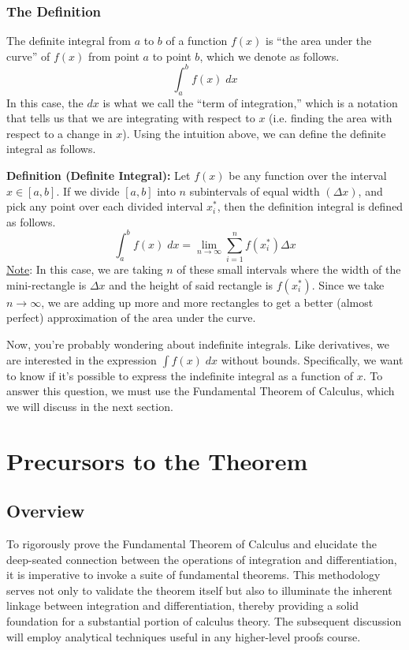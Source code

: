 \subsubsection{The Definition}
The definite integral from $a$ to $b$ of a function $f(x)$ is ``the area under the curve'' of $f(x)$ from point $a$ to point $b$, which we denote as follows.
$$
\int_a^b f(x) \;dx
$$
In this case, the $dx$ is what we call the ``term of integration,'' which is a notation that tells us that we are integrating with respect to $x$ (i.e. finding the area with respect to a change in $x$). Using the intuition above, we can define the definite integral as follows.
\begin{boxedsection}
  \textbf{Definition (Definite Integral):} Let $f(x)$ be any function over the interval $x \in [a,b]$. If we divide $[a,b]$ into $n$ subintervals of equal width $(\Delta x)$, and pick any point over each divided interval $x_i^*$, then the definition integral is defined as follows.
  $$
  \int_a^b f(x) \;dx = \lim_{n\rightarrow\infty} \sum_{i=1}^n f(x_i^*) \Delta x 
  $$
  \underline{Note}: In this case, we are taking $n$ of these small intervals where the width of the mini-rectangle is $\Delta x$ and the height of said rectangle is $f(x_i^*)$. Since we take $n \rightarrow \infty$, we are adding up more and more rectangles to get a better (almost perfect) approximation of the area under the curve.
\end{boxedsection}
Now, you're probably wondering about indefinite integrals. Like derivatives, we are interested in the expression $\int f(x)\;dx$ without bounds. Specifically, we want to know if it's possible to express the indefinite integral as a function of $x$. To answer this question, we must use the Fundamental Theorem of Calculus, which we will discuss in the next section.
\pagebreak
\section{Precursors to the Theorem}
\subsection{Overview}
To rigorously prove the Fundamental Theorem of Calculus and elucidate the deep-seated connection between the operations of integration and differentiation, it is imperative to invoke a suite of fundamental theorems. This methodology serves not only to validate the theorem itself but also to illuminate the inherent linkage between integration and differentiation, thereby providing a solid foundation for a substantial portion of calculus theory. The subsequent discussion will employ analytical techniques useful in any higher-level proofs course.
